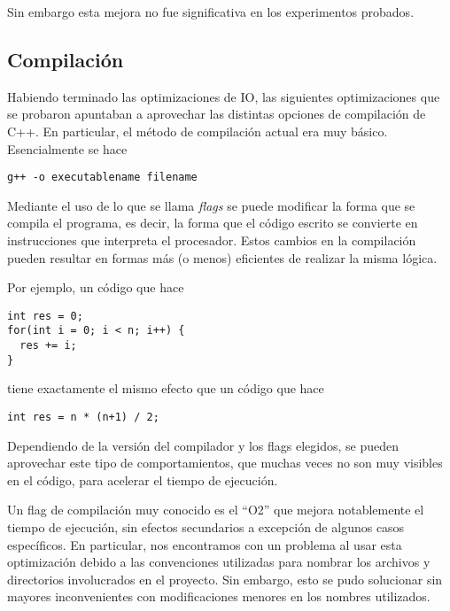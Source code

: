 \documentclass{article}
\begin{document}
Sin embargo esta mejora no fue significativa en los experimentos probados.

\subsection{Compilación}
Habiendo terminado las optimizaciones de IO, las siguientes optimizaciones que se probaron apuntaban a aprovechar las distintas opciones de compilación de C++. En particular, el método de compilación actual era muy básico. Esencialmente se hace 
\begin{lstlisting}
g++ -o executablename filename
\end{lstlisting}
Mediante el uso de lo que se llama \emph{flags} se puede modificar la forma que se compila el programa, es decir, la forma que el código escrito se convierte en instrucciones que interpreta el procesador. Estos cambios en la compilación pueden resultar en formas más (o menos) eficientes de realizar la misma lógica.

Por ejemplo, un código que hace
\begin{lstlisting}
int res = 0;
for(int i = 0; i < n; i++) {
  res += i;
}
\end{lstlisting}
tiene exactamente el mismo efecto que un código que hace
\begin{lstlisting}
int res = n * (n+1) / 2;
\end{lstlisting}

Dependiendo de la versión del compilador y los flags elegidos, se pueden aprovechar este tipo de comportamientos, que muchas veces no son muy visibles en el código, para acelerar el tiempo de ejecución. 

Un flag de compilación muy conocido es el ``O2'' que mejora notablemente el tiempo de ejecución, sin efectos secundarios a excepción de algunos casos específicos. En particular, nos encontramos con un problema al usar esta optimización debido a las convenciones utilizadas para nombrar los archivos y directorios involucrados en el proyecto. Sin embargo, esto se pudo solucionar sin mayores inconvenientes con modificaciones menores en los nombres utilizados.
\end{document}
